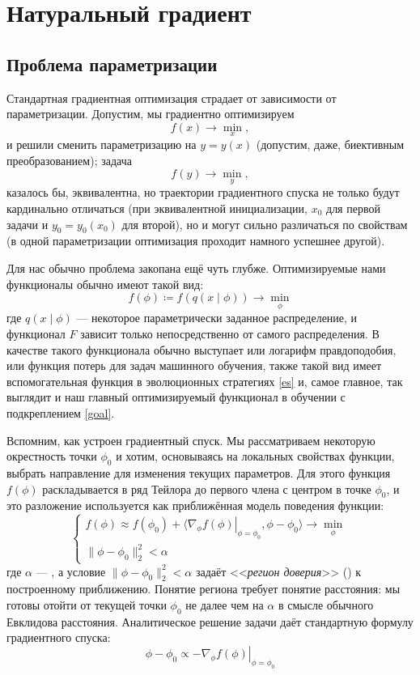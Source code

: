 \section{Натуральный градиент}

\subsection{Проблема параметризации}

Стандартная градиентная оптимизация страдает от зависимости от параметризации. Допустим, мы градиентно оптимизируем
$$f(x) \to \min_x ,$$
и решили сменить параметризацию на $y = y(x)$ (допустим, даже, биективным преобразованием); задача
$$f(y) \to \min_y ,$$
казалось бы, эквивалентна, но траектории градиентного спуска не только будут кардинально отличаться (при эквивалентной инициализации, $x_0$ для первой задачи и $y_0 = y_0(x_0)$ для второй), но и могут сильно различаться по свойствам (в одной параметризации оптимизация проходит намного успешнее другой).

Для нас обычно проблема закопана ещё чуть глубже. Оптимизируемые нами функционалы обычно имеют такой вид:
\begin{equation}\label{NGmotivation}
f(\phi) \coloneqq f(q(x \mid \phi)) \to \min_\phi
\end{equation}
где $q(x \mid \phi)$ --- некоторое параметрически заданное распределение, и функционал $F$ зависит только непосредственно от самого распределения. В качестве такого функционала обычно выступает или логарифм правдоподобия, или функция потерь для задач машинного обучения, также такой вид имеет вспомогательная функция в эволюционных стратегиях \eqref{es} и, самое главное, так выглядит и наш главный оптимизируемый функционал в обучении с подкреплением \eqref{goal}.

Вспомним, как устроен градиентный спуск. Мы рассматриваем некоторую окрестность точки $\phi_0$ и хотим, основываясь на локальных свойствах функции, выбрать направление для изменения текущих параметров. Для этого функция $f(\phi)$ раскладывается в ряд Тейлора до первого члена с центром в точке $\phi_0$, и это разложение используется как приближённая модель поведения функции:
$$\begin{cases}
f(\phi) \approx f(\phi_0) + \langle \left. \nabla_\phi f(\phi) \right|_{\phi = \phi_0}, \phi - \phi_0 \rangle \to \min\limits_{\phi} \\
\|\phi - \phi_0\|_2^2 < \alpha
\end{cases}$$
где $\alpha$ --- , а условие $\|\phi - \phi_0\|_2^2 < \alpha$ задаёт <<\emph{регион доверия}>> () к построенному приближению. Понятие региона требует понятие расстояния: мы готовы отойти от текущей точки $\phi_0$ не далее чем на $\alpha$ в смысле обычного Евклидова расстояния. Аналитическое решение задачи даёт стандартную формулу градиентного спуска:
$$\phi - \phi_0 \propto - \left. \nabla_\phi f(\phi) \right|_{\phi = \phi_0}$$

